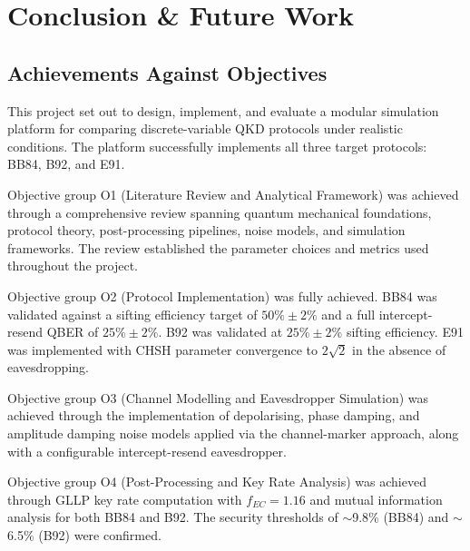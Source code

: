 \documentclass[10pt, a4paper]{report}
\begin{document}
\chapter{Conclusion \& Future Work}


\section{Achievements Against Objectives}

This project set out to design, implement, and evaluate a modular simulation platform for comparing discrete-variable QKD protocols under realistic conditions. The platform successfully implements all three target protocols: BB84, B92, and E91.

Objective group O1 (Literature Review and Analytical Framework) was achieved through a comprehensive review spanning quantum mechanical foundations, protocol theory, post-processing pipelines, noise models, and simulation frameworks. The review established the parameter choices and metrics used throughout the project.

Objective group O2 (Protocol Implementation) was fully achieved. BB84 was validated against a sifting efficiency target of $50\% \pm 2\%$ and a full intercept-resend QBER of $25\% \pm 2\%$. B92 was validated at $25\% \pm 2\%$ sifting efficiency. E91 was implemented with CHSH parameter convergence to $2\sqrt{2}$ in the absence of eavesdropping.

Objective group O3 (Channel Modelling and Eavesdropper Simulation) was achieved through the implementation of depolarising, phase damping, and amplitude damping noise models applied via the channel-marker approach, along with a configurable intercept-resend eavesdropper.

Objective group O4 (Post-Processing and Key Rate Analysis) was achieved through GLLP key rate computation with $f_{EC} = 1.16$ and mutual information analysis for both BB84 and B92. The security thresholds of $\sim$9.8\% (BB84) and $\sim$6.5\% (B92) were confirmed.
\end{document}
